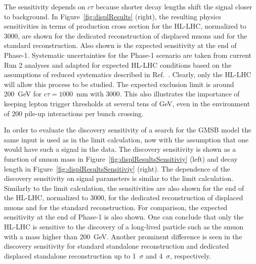 The sensitivity depends on $c\tau$ because shorter decay lengths shift the signal closer to background. In Figure~\ref{fig:displResults} (right), the resulting physics sensitivities in terms of production cross section for the HL-LHC, normalized to $3000$\fbinv, are shown for the dedicated reconstruction of displaced muons and for the standard reconstruction. Also shown is the expected sensitivity at the end of Phase-1. Systematic uncertainties for the Phase-1 scenario are taken from current Run 2 analyses and adapted for expected HL-LHC conditions based on the assumptions of reduced systematics described in Ref.~\cite{FTR-16-005}. Clearly, only the HL-LHC will allow this process to be studied. The expected exclusion limit is around 200~GeV for $c\tau = 1000$~mm with 3000\fbinv. This also illustrates the importance of keeping lepton trigger thresholds at several tens of GeV, even in the environment of 200 pile-up interactions per bunch crossing.

In order to evaluate the discovery sensitivity of a search for the GMSB model the same input is used as in the limit calculation, now with the assumption that one would have such a signal in the data. The discovery sensitivity is shown as a function of smuon mass in Figure~\ref{fig:displResultsSensitiviy} (left) and decay length in Figure~\ref{fig:displResultsSensitiviy} (right). The dependence of the discovery sensitivity on signal parameters is similar to the limit calculation. Similarly to the limit calculation, the sensitivities are also shown for the end of the HL-LHC, normalized to 3000\fbinv, for the dedicated reconstruction of displaced muons and for the standard reconstruction. For comparison, the expected sensitivity at the end of Phase-1 is also shown. One can conclude that only the HL-LHC is sensitive to the discovery of a long-lived particle such as the smuon with a mass higher than $200$~GeV. Another prominent difference is seen in the discovery sensitivity for standard standalone reconstruction and dedicated displaced standalone reconstruction up to 1~$\sigma$ and 4~$\sigma$, respectively.

